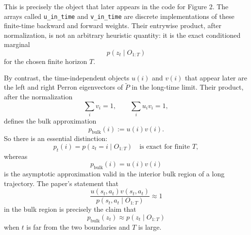 \documentclass[11pt]{article}
\begin{document}
This is precisely the object that later appears in the code for Figure 2. The arrays called
\texttt{u\_in\_time} and \texttt{v\_in\_time} are discrete implementations of these finite-time
backward and forward weights. Their entrywise product, after normalization, is not an
arbitrary heuristic quantity: it is the exact conditioned marginal
\begin{equation}
    p(z_t\mid O_{1:T})
\end{equation}
for the chosen finite horizon \(T\).

By contrast, the time-independent objects \(u(i)\) and \(v(i)\) that appear later are the
left and right Perron eigenvectors of \(\widetilde P\) in the long-time limit. Their product,
after the normalization
\begin{equation}
    \sum_i v_i=1,
    \qquad
    \sum_i u_i v_i=1,
\end{equation}
defines the bulk approximation
\begin{equation}
    p_{\mathrm{bulk}}(i):=u(i)v(i).
\end{equation}
So there is an essential distinction:
\begin{equation}
    p_t(i)=p(z_t=i\mid O_{1:T})
    \quad \text{is exact for finite } T,
\end{equation}
whereas
\begin{equation}
    p_{\mathrm{bulk}}(i)=u(i)v(i)
\end{equation}
is the asymptotic approximation valid in the interior bulk region of a long trajectory. The
paper's statement that
\begin{equation}
    \frac{u(s_t,a_t)v(s_t,a_t)}{p(s_t,a_t\mid O_{1:T})}\approx 1
\end{equation}
in the bulk region is precisely the claim that
\begin{equation}
    p_{\mathrm{bulk}}(z_t)\approx p(z_t\mid O_{1:T})
\end{equation}
when \(t\) is far from the two boundaries and \(T\) is large.
\end{document}
